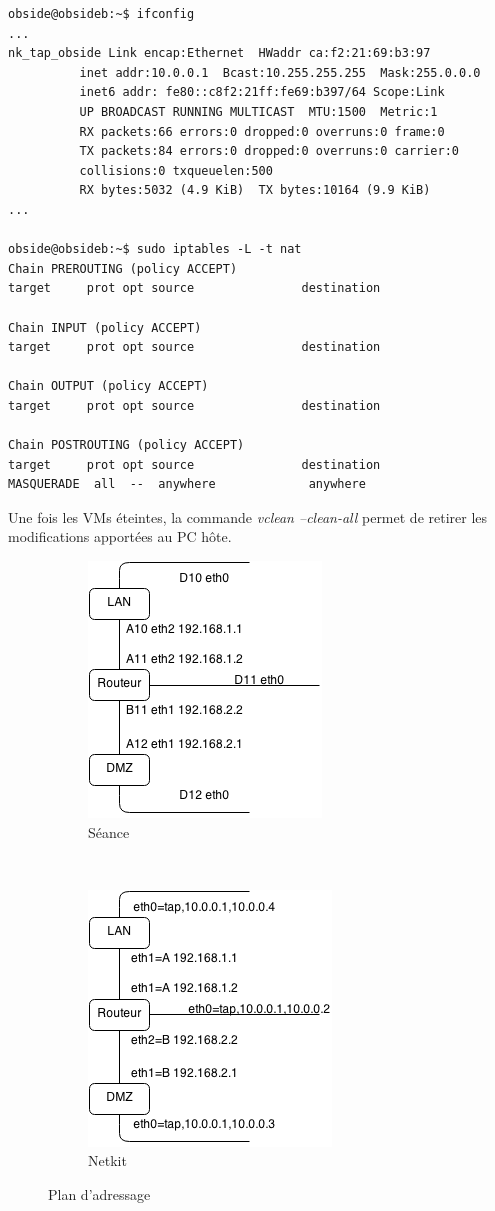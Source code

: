 \documentclass[frenchb, 11pt]{article}
\begin{document}
\begin{lstlisting}
obside@obsideb:~$ ifconfig
...
nk_tap_obside Link encap:Ethernet  HWaddr ca:f2:21:69:b3:97  
          inet addr:10.0.0.1  Bcast:10.255.255.255  Mask:255.0.0.0
          inet6 addr: fe80::c8f2:21ff:fe69:b397/64 Scope:Link
          UP BROADCAST RUNNING MULTICAST  MTU:1500  Metric:1
          RX packets:66 errors:0 dropped:0 overruns:0 frame:0
          TX packets:84 errors:0 dropped:0 overruns:0 carrier:0
          collisions:0 txqueuelen:500 
          RX bytes:5032 (4.9 KiB)  TX bytes:10164 (9.9 KiB)
...

obside@obsideb:~$ sudo iptables -L -t nat
Chain PREROUTING (policy ACCEPT)
target     prot opt source               destination         

Chain INPUT (policy ACCEPT)
target     prot opt source               destination         

Chain OUTPUT (policy ACCEPT)
target     prot opt source               destination         

Chain POSTROUTING (policy ACCEPT)
target     prot opt source               destination         
MASQUERADE  all  --  anywhere             anywhere  
\end{lstlisting}
Une fois les VMs éteintes, la commande \emph{vclean --clean-all} permet de retirer les modifications apportées au PC hôte.

\begin{figure}[h!]
	\centering
	\begin{subfigure}[b]{0.4\textwidth}
		\includegraphics[scale=0.80]{sch1.png}
		\caption{Séance}
	\end{subfigure}%
	~
	\begin{subfigure}[b]{0.4\textwidth}
	\includegraphics[scale=0.80]{sch2.png}
	\caption{Netkit}
	\label{fig:planadrnetkit}
	\end{subfigure}
	\caption{Plan d'adressage}
\end{figure}
\end{document}
